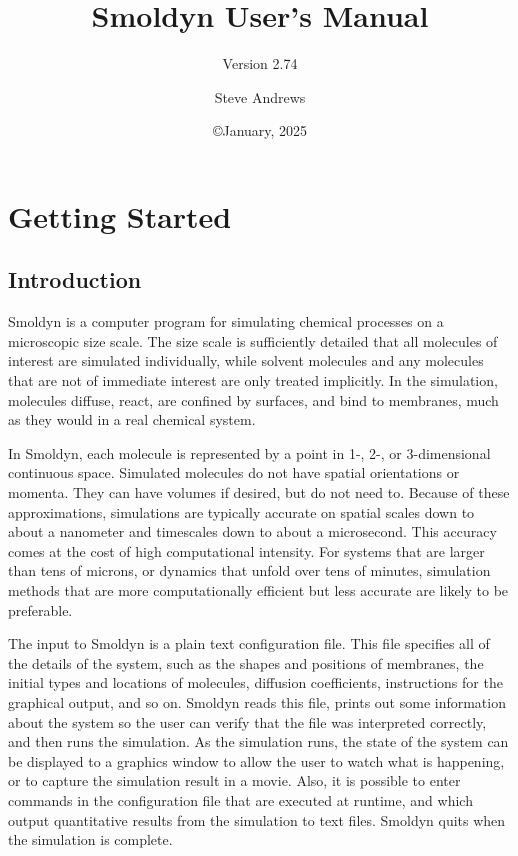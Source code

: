 \documentclass {scrbook}
\begin{document}


\title{Smoldyn User's Manual}
\subtitle{Version 2.74}
\date{\copyright January, 2025}
\author{Steve Andrews}
\maketitle

\tableofcontents


\part{Getting Started}

\chapter{Introduction}

Smoldyn is a computer program for simulating chemical processes on a microscopic size scale. The size scale is sufficiently detailed that all molecules of interest are simulated individually, while solvent molecules and any molecules that are not of immediate interest are only treated implicitly. In the simulation, molecules diffuse, react, are confined by surfaces, and bind to membranes, much as they would in a real chemical system.

In Smoldyn, each molecule is represented by a point in 1-, 2-, or 3-dimensional continuous space. Simulated molecules do not have spatial orientations or momenta. They can have volumes if desired, but do not need to. Because of these approximations, simulations are typically accurate on spatial scales down to about a nanometer and timescales down to about a microsecond. This accuracy comes at the cost of high computational intensity. For systems that are larger than tens of microns, or dynamics that unfold over tens of minutes, simulation methods that are more computationally efficient but less accurate are likely to be preferable.

The input to Smoldyn is a plain text configuration file. This file specifies all of the details of the system, such as the shapes and positions of membranes, the initial types and locations of molecules, diffusion coefficients, instructions for the graphical output, and so on. Smoldyn reads this file, prints out some information about the system so the user can verify that the file was interpreted correctly, and then runs the simulation. As the simulation runs, the state of the system can be displayed to a graphics window to allow the user to watch what is happening, or to capture the simulation result in a movie. Also, it is possible to enter commands in the configuration file that are executed at runtime, and which output quantitative results from the simulation to text files. Smoldyn quits when the simulation is complete.
\end{document}
